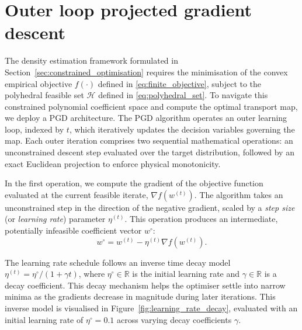 \section{Outer loop projected gradient descent}
\label{sec:outer_loop_pgd}

The density estimation framework formulated in Section~\ref{sec:constrained_optimisation} requires the minimisation of the convex empirical objective $f(\cdot)$ defined in \eqref{eq:finite_objective}, subject to the polyhedral feasible set $\mathcal{H}$ defined in \eqref{eq:polyhedral_set}. To navigate this constrained polynomial coefficient space and compute the optimal transport map, we deploy a PGD architecture. The PGD algorithm operates an outer learning loop, indexed by $t$, which iteratively updates the decision variables governing the map. Each outer iteration comprises two sequential mathematical operations: an unconstrained descent step evaluated over the target distribution, followed by an exact Euclidean projection to enforce physical monotonicity. 

In the first operation, we compute the gradient of the objective function evaluated at the current feasible iterate, $\nabla f(w^{(t)})$. The algorithm takes an unconstrained step in the direction of the negative gradient, scaled by a \emph{step size} (or \emph{learning rate}) parameter $\eta^{(t)}$. This operation produces an intermediate, potentially infeasible coefficient vector $w^{\circ}$:
\begin{equation}
    w^{\circ} = w^{(t)} - \eta^{(t)} \nabla f(w^{(t)}).
    \label{eq:pgd_unconstrained_gradient_step}
\end{equation}

The learning rate schedule follows an inverse time decay model $\eta^{(t)} = \eta^\circ / (1 + \gamma t)$, where $\eta^\circ \in \mathbb{R}$ is the initial learning rate and $\gamma \in \mathbb{R}$ is a decay coefficient. This decay mechanism helps the optimiser settle into narrow minima as the gradients decrease in magnitude during later iterations. This inverse model is visualised in Figure~\ref{fig:learning_rate_decay}, evaluated with an initial learning rate of $\eta^\circ = 0.1$ across varying decay coefficients $\gamma$.

